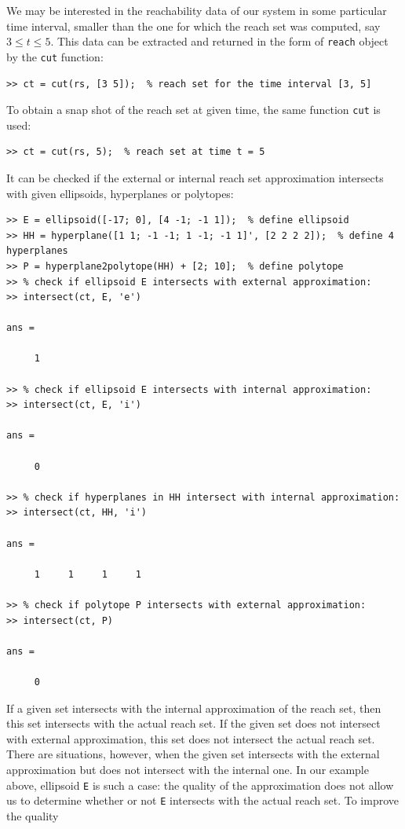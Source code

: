 \documentclass{report}
\begin{document}
We may be interested in the reachability data of our system in some
particular time interval, smaller than the one for which the reach set was
computed, say $3\leq t\leq5$.
This data can be extracted and returned in the form of {\tt reach}
object by the {\tt cut} function:
{\tt \begin{verbatim}
>> ct = cut(rs, [3 5]);  % reach set for the time interval [3, 5]
\end{verbatim} }
To obtain a snap shot of the reach set at given time, the same function
{\tt cut} is used:
{\tt \begin{verbatim}
>> ct = cut(rs, 5);  % reach set at time t = 5
\end{verbatim} }
It can be checked if the external or internal reach set approximation
intersects with given ellipsoids, hyperplanes or polytopes:
{\tt \begin{verbatim}
>> E = ellipsoid([-17; 0], [4 -1; -1 1]);  % define ellipsoid
>> HH = hyperplane([1 1; -1 -1; 1 -1; -1 1]', [2 2 2 2]);  % define 4 hyperplanes
>> P = hyperplane2polytope(HH) + [2; 10];  % define polytope
>> % check if ellipsoid E intersects with external approximation:
>> intersect(ct, E, 'e')

ans =

     1

>> % check if ellipsoid E intersects with internal approximation:
>> intersect(ct, E, 'i')

ans =

     0

>> % check if hyperplanes in HH intersect with internal approximation:
>> intersect(ct, HH, 'i')

ans =

     1     1     1     1

>> % check if polytope P intersects with external approximation:
>> intersect(ct, P)

ans =

     0
\end{verbatim} }
If a given set intersects with the internal approximation of the reach set,
then this set intersects with the actual reach set.
If the given set does not
intersect with external approximation, this set does not
intersect the actual reach set. There are situations, however, when the
given set intersects with the external approximation but does not intersect
with the internal one. In our example above, ellipsoid {\tt E} is such a case:
the quality of the approximation does not allow us to determine whether or not
{\tt E} intersects with the actual reach set. To improve the quality
\end{document}
